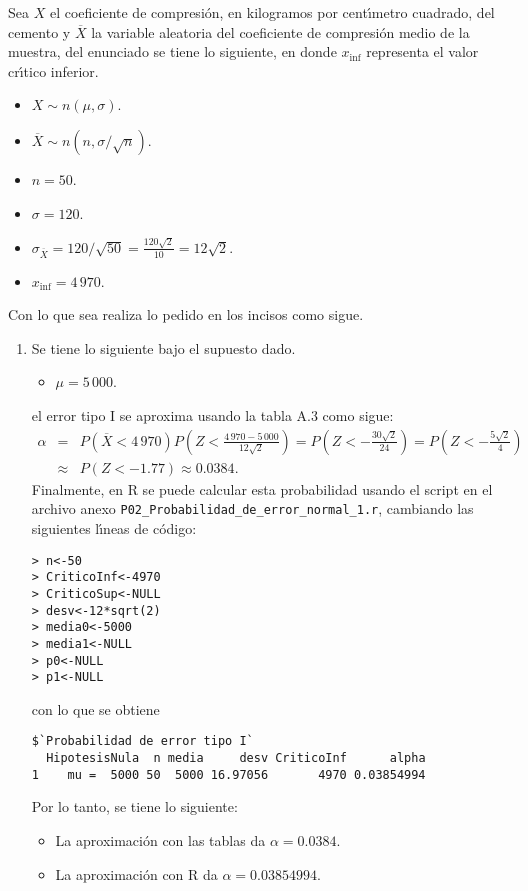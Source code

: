 \begin{solucion}
 Sea $X$ el coeficiente de compresi\'on, en kilogramos por cent\'{\i}metro cuadrado, del cemento y $\overline{X}$ la variable aleatoria del coeficiente de compresi\'on medio de la muestra, del enunciado se tiene lo siguiente, en donde $x_{\text{inf}}$ representa el valor cr\'{\i}tico inferior.
 \begin{itemize}
  \item $X \sim n(\mu, \sigma)$.
  \item $\overline{X} \sim n\left( n, \sigma/\sqrt{n} \right)$.
  \item $n = 50$.
  \item $\sigma = 120$.
  \item $\sigma_{\overline{X}} = 120/\sqrt{50} = \frac{120\sqrt{2}}{10} = 12\sqrt{2}$.
  \item $x_{\text{inf}} = 4\,970$.
 \end{itemize}
 Con lo que sea realiza lo pedido en los incisos como sigue.
 \begin{enumerate}
  \item Se tiene lo siguiente bajo el supuesto dado.
  \begin{itemize}
   \item $\mu = 5\,000$.
  \end{itemize}
  el error tipo I se aproxima usando la tabla A.3 como sigue:
  \begin{eqnarray*}
   \alpha & = & P\left( \overline{X} < 4\,970 \right) P\left( Z < \frac{4\,970 - 5\,000}{12\sqrt{2}} \right) = P\left( Z < -\frac{30\sqrt{2}}{24} \right) = P\left( Z < -\frac{5\sqrt{2}}{4} \right) \\
   & \approx & P(Z < -1.77) \approx 0.0384.
  \end{eqnarray*}
  Finalmente, en R se puede calcular esta probabilidad usando el script en el archivo anexo \texttt{P02\_Probabilidad\_de\_error\_normal\_1.r}, cambiando las siguientes l\'{\i}neas de c\'odigo:
  \begin{verbatim}
> n<-50
> CriticoInf<-4970
> CriticoSup<-NULL
> desv<-12*sqrt(2)
> media0<-5000
> media1<-NULL
> p0<-NULL
> p1<-NULL
  \end{verbatim}
  \vspace{-0.5cm}
  con lo que se obtiene
  \begin{verbatim}
$`Probabilidad de error tipo I`
  HipotesisNula  n media     desv CriticoInf      alpha
1    mu =  5000 50  5000 16.97056       4970 0.03854994
  \end{verbatim}
  \vspace{-0.5cm}
  Por lo tanto, se tiene lo siguiente:
  \begin{itemize}
   \item La aproximaci\'on con las tablas da $\alpha = 0.0384$.
   \item La aproximaci\'on con R da $\alpha = 0.03854994$.
  \end{itemize}


\end{enumerate}
\end{solucion}
